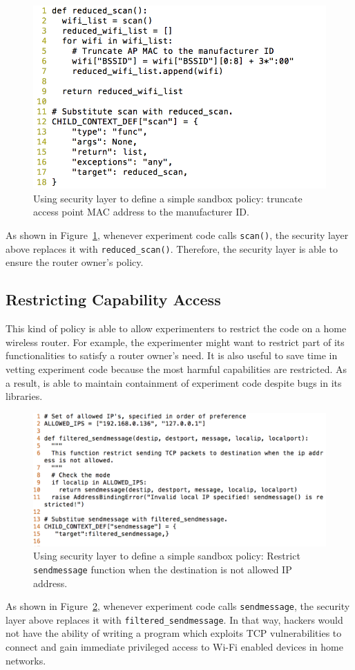 \begin{figure}%
\centering
\includegraphics[width=0.8\columnwidth]{figure/example.png}
\caption{Using security layer to define a simple sandbox policy: truncate access point MAC address to the manufacturer ID.}
\label{fig-examplecode1}
\end{figure}

As shown in Figure~\ref{fig-examplecode1}, whenever experiment code calls
 \texttt{scan()}, the security layer above replaces it with \texttt{reduced\_scan()}.
 Therefore, the security layer is able to ensure the router owner's policy.

\subsection{Restricting Capability Access}
This kind of policy is able to allow experimenters to restrict the code on a home
 wireless router. For example, the experimenter might want to restrict part of its
  functionalities to satisfy a router owner's need. It is also useful to save time
in vetting experiment code because the most harmful capabilities are restricted.
 As a result, \sysname is able to maintain containment of experiment code despite
  bugs in its libraries.

\begin{figure}%
\centering
\includegraphics[width=0.8\columnwidth]{figure/example-restrict_data.png}
\caption{Using security layer to define a simple sandbox policy: Restrict \texttt{sendmessage} function when the destination is not allowed IP address.}
\label{fig-examplecode2}
\end{figure}

As shown in Figure~\ref{fig-examplecode2}, whenever experiment code calls \texttt{sendmessage}, the security layer above replaces it with \texttt{filtered\_sendmessage}. In that way, hackers would not have the ability of writing a program which exploits TCP vulnerabilities to connect and gain immediate privileged access to Wi-Fi enabled devices in home networks.
